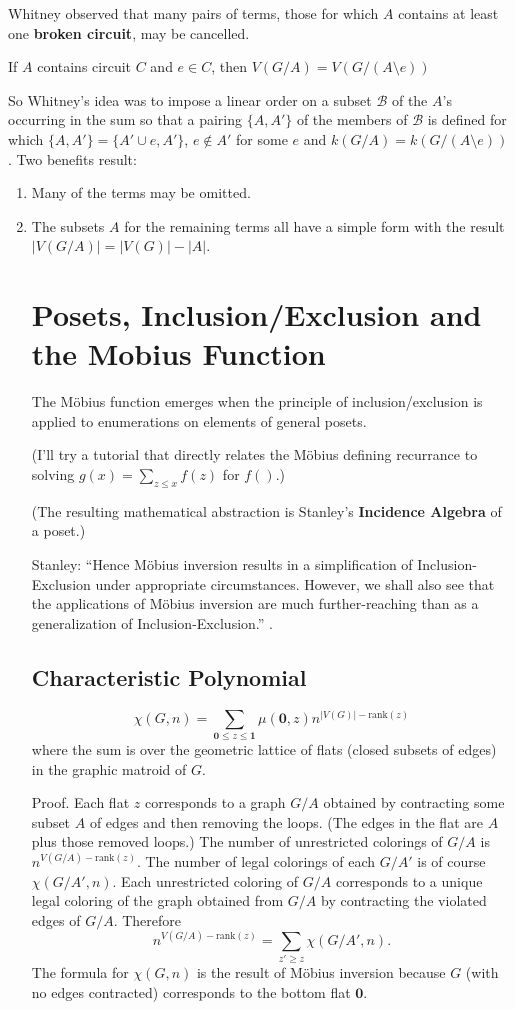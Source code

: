 \documentclass{article}
\begin{document}
Whitney\cite{WhitLogExpMath} observed that 
many pairs of terms, those for which $A$ contains at least 
one \textbf{broken circuit}, may be cancelled.

If $A$ contains circuit $C$ and $e\in C$, then $V(G/A) = V(G/(A\setminus e))$

So Whitney's idea was to impose a linear order on a subset $\mathcal{B}$
of the $A$'s occurring 
in the sum so that a pairing $\{A,A'\}$ of the members of $\mathcal{B}$ 
is defined for which $\{A,A'\}=\{A'\cup e, A'\}$, $e\not\in A'$ for some $e$
and $k(G/A) = k(G/(A\setminus e))$.  Two benefits result:
\begin{enumerate}
\item Many of the terms may be omitted.
\item The subsets $A$ for the remaining terms all have a simple form with the 
result $|V(G/A)| = |V(G)| - |A| $.

\section{Posets, Inclusion/Exclusion and the Mobius Function}

The M\"{o}bius function emerges when the principle of inclusion/exclusion is
applied to enumerations on elements of general posets.

(I'll try a tutorial that directly relates the M\"{o}bius defining recurrance to
solving $g(x) = \sum_{z\le x}f(z)$ for $f()$.)

(The resulting mathematical abstraction is Stanley's 
\textbf{Incidence Algebra} of a poset\cite{StanleyEC1}.)

Stanley: ``Hence M\"{o}bius inversion results in a simplification
of Inclusion-Exclusion under appropriate circumstances. However, we shall also see that
the applications of M\"{o}bius inversion are much 
further-reaching than as a generalization of
Inclusion-Exclusion.'' \cite[ch.~3]{StanleyEC1}.


\subsection{Characteristic Polynomial}

\[
\chi(G,n) = \sum_{\textbf{0}\le z\le \textbf{1}}\mu(\textbf{0}, z)n^{|V(G)|-\text{rank}(z)}
\]
where the sum is over the geometric lattice of flats (closed subsets of edges)
in the graphic matroid of $G$.  

Proof.  Each flat $z$ corresponds to a graph $G/A$ obtained by 
contracting some
subset $A$ of edges and then removing the loops. 
(The edges in the flat are $A$ plus those removed loops.)
The number of unrestricted colorings of $G/A$ is $n^{V(G/A)-\text{rank}(z)}$.
The number of legal colorings of each $G/A'$ is of course $\chi(G/A',n)$.
Each unrestricted coloring of $G/A$ corresponds to a unique legal coloring of
the graph obtained from $G/A$ by contracting the violated edges of $G/A$.  
Therefore 
\[
n^{V(G/A)-\text{rank}(z)} = \sum_{z'\ge z}\chi(G/A',n).
\]
The formula for $\chi(G,n)$ is the result of M\"{o}bius inversion because
$G$ (with no edges contracted) corresponds to the bottom flat $\textbf{0}$.


\end{enumerate}
\end{document}
